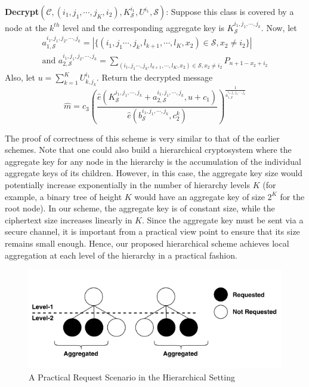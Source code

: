 \noindent \textbf{Decrypt}$(\mathcal{C},(i_1,j_1,\cdots,j_K,i_2),K^{i_1}_{\mathcal{S}},U^{i_1},\mathcal{S})$: Suppose this class is covered by a node at the $k^{th}$ level and the corresponding aggregate key is $K^{i_1,j_1,\cdots,j_k}_{\mathcal{S}}$. Now, let 
\begin{eqnarray}
a^{i_1,j_1,j_2,\cdots,j_k}_{1,\mathcal{S}}=|\{(i_1,j_1\cdots,j_k,l_{k+1},\cdots,l_{K},x_2)\in \mathcal{S},x_2\neq i_2\}|\nonumber\\
\text{and }a^{i_1,j_1,j_2,\cdots,j_k}_{2,\mathcal{S}}=\sum_{(i_1,j_1\cdots,j_k,l_{k+1},\cdots,l_{K},x_2)\in \mathcal{S},x_2\neq i_2}P_{n+1-x_2+i_2}\nonumber
\end{eqnarray}
\noindent Also, let $u=\sum_{k=1}^{K}U^{i_1}_{k,j_k}$. Return the decrypted message
\begin{equation}
\hat{m}=c_3{\left(\frac{\hat{e}(K^{i_1,j_1,\cdots,j_k}_{\mathcal{S}}+a^{i_1,j_1,\cdots,j_k}_{2,\mathcal{S}},u+c_1)}{\hat{e}(b^{i_1,j_1,\cdots,j_k}_{\mathcal{S}},c^{k}_2)}\right)}^{\frac{1}{a^{i_1,j_1,j_2,\cdots,j_k}_{1,\mathcal{S}}}}\nonumber
\end{equation}

\noindent The proof of correctness of this scheme is very similar to that of the earlier schemes. Note that one could also build a hierarchical cryptosystem where the aggregate key for any node in the hierarchy is the accumulation of the individual aggregate keys of its children. However, in this case, the aggregate key size would potentially increase exponentially in the number of hierarchy levels $K$ (for example, a binary tree of height $K$ would have an aggregate key of size $2^K$ for the root node). In our scheme, the aggregate key is of constant size, while the ciphertext size increases linearly in $K$. Since the aggregate key must be sent via a secure channel, it is important from a practical view point to ensure that its size remains small enough. Hence, our proposed hierarchical scheme achieves local aggregation at each level of the hierarchy in a practical fashion.  

\begin{figure}[!t]
\centering
\captionsetup{font=scriptsize}
\includegraphics[scale=0.5]{Figs/tree.png}
\caption{A Practical Request Scenario in the Hierarchical Setting}
\label{fig:agg}
\end{figure}





